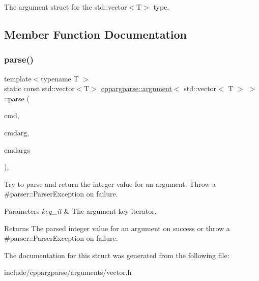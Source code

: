 The argument struct for the std\+::vector$<$\+T$>$ type. 

\subsection{Member Function Documentation}
\mbox{\label{structcppargparse_1_1argument_3_01std_1_1vector_3_01T_01_4_01_4_a0e6251b0eaf62369653e4f5c1a40fffd}} 
\subsubsection{\texorpdfstring{parse()}{parse()}}
{\footnotesize\ttfamily template$<$typename T $>$ \\
static const std\+::vector$<$T$>$ \hyperlink{structcppargparse_1_1argument}{cppargparse\+::argument}$<$ std\+::vector$<$ T $>$ $>$\+::parse (\begin{DoxyParamCaption}\item[{const types\+::\+Command\+Line\+\_\+t \&}]{cmd,  }\item[{const types\+::\+Command\+Line\+Argument\+\_\+t \&}]{cmdarg,  }\item[{const types\+::\+Command\+Line\+Arguments\+Map\+\_\+t \&}]{cmdargs }\end{DoxyParamCaption})\hspace{0.3cm}{\ttfamily [inline]}, {\ttfamily [static]}}



Try to parse and return the integer value for an argument. Throw a \#parser\+::\+Parser\+Exception on failure. 


\begin{DoxyParams}{Parameters}
{\em key\+\_\+it} & The argument key iterator.\\
\hline
\end{DoxyParams}
\begin{DoxyReturn}{Returns}
The parsed integer value for an argument on success or throw a \#parser\+::\+Parser\+Exception on failure. 
\end{DoxyReturn}


The documentation for this struct was generated from the following file\+:\begin{DoxyCompactItemize}
\item 
include/cppargparse/arguments/vector.\+h\end{DoxyCompactItemize}

